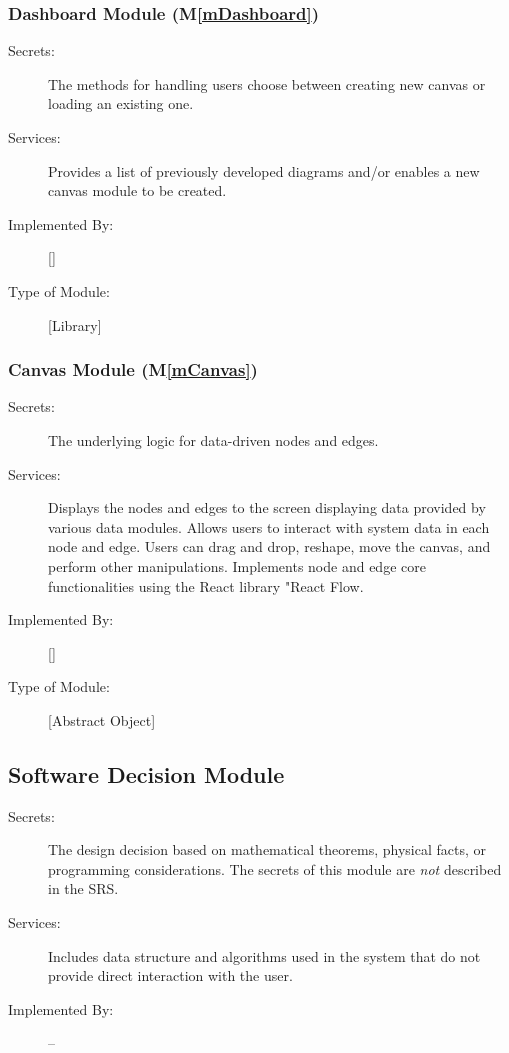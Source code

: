 \documentclass[12pt, titlepage]{article}
\newcommand{\mref}[1]{M\ref{#1}}
\begin{document}
\subsubsection{Dashboard Module (\mref{mDashboard})}
\begin{description}
\item[Secrets:]The methods for handling users choose between creating new canvas or loading an existing one.
\item[Services:]Provides a list of previously developed diagrams and/or enables a new canvas module to be created.
\item[Implemented By:] [\progname]
\item[Type of Module:] [Library]
\end{description}

\subsubsection{Canvas Module (\mref{mCanvas})}
\begin{description}
\item[Secrets:] The underlying logic for data-driven nodes and edges. 
\item[Services:] Displays the nodes and edges to the screen displaying data provided by various data modules. Allows users to interact with system data in each node and edge. Users can drag and drop, reshape, move the canvas, and perform other manipulations. Implements node and edge core functionalities using the React library "React Flow.
\item[Implemented By:] [\progname]
\item[Type of Module:] [Abstract Object]
\end{description}

\subsection{Software Decision Module}

\begin{description}
\item[Secrets:] The design decision based on mathematical theorems, physical
  facts, or programming considerations. The secrets of this module are
  \emph{not} described in the SRS.
\item[Services:] Includes data structure and algorithms used in the system that
  do not provide direct interaction with the user. 
\item[Implemented By:] --
\end{description}
\end{document}
